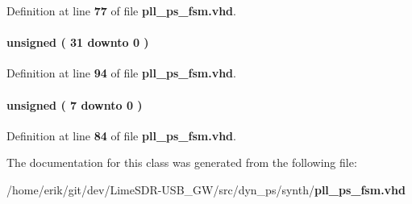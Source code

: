 Definition at line {\bf 77} of file {\bf pll\+\_\+ps\+\_\+fsm.\+vhd}.

\paragraph[{time\+\_\+count}]{ {\bfseries \textcolor{comment}{unsigned}\textcolor{vhdlchar}{ }\textcolor{vhdlchar}{(}\textcolor{vhdlchar}{ }\textcolor{vhdlchar}{ } \textcolor{vhdldigit}{31} \textcolor{vhdlchar}{ }\textcolor{keywordflow}{downto}\textcolor{vhdlchar}{ }\textcolor{vhdlchar}{ } \textcolor{vhdldigit}{0} \textcolor{vhdlchar}{ }\textcolor{vhdlchar}{)}\textcolor{vhdlchar}{ }} \hspace{0.3cm}{\ttfamily [Signal]}}\label{classpll__ps__fsm_1_1arch_a55deeac52740c3615655adc84e90d43d}


Definition at line {\bf 94} of file {\bf pll\+\_\+ps\+\_\+fsm.\+vhd}.

\paragraph[{wait\+\_\+after\+\_\+ph\+\_\+shift\+\_\+cnt}]{ {\bfseries \textcolor{comment}{unsigned}\textcolor{vhdlchar}{ }\textcolor{vhdlchar}{(}\textcolor{vhdlchar}{ }\textcolor{vhdlchar}{ } \textcolor{vhdldigit}{7} \textcolor{vhdlchar}{ }\textcolor{keywordflow}{downto}\textcolor{vhdlchar}{ }\textcolor{vhdlchar}{ } \textcolor{vhdldigit}{0} \textcolor{vhdlchar}{ }\textcolor{vhdlchar}{)}\textcolor{vhdlchar}{ }} \hspace{0.3cm}{\ttfamily [Signal]}}\label{classpll__ps__fsm_1_1arch_a72fa414cd3cd9982d4497d04044b0dd9}


Definition at line {\bf 84} of file {\bf pll\+\_\+ps\+\_\+fsm.\+vhd}.



The documentation for this class was generated from the following file\+:\begin{DoxyCompactItemize}
\item 
/home/erik/git/dev/\+Lime\+S\+D\+R-\/\+U\+S\+B\+\_\+\+G\+W/src/dyn\+\_\+ps/synth/{\bf pll\+\_\+ps\+\_\+fsm.\+vhd}\end{DoxyCompactItemize}
